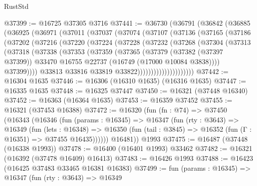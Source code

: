 \begin{lexlean}{RustStd}
\begin{coremodule}
@37399 := @16725 @37305 @3716
@37441 := @36730
    (@36791
      (@36842
        (@36885
          (@36925
            (@36971
              (@37011
                (@37037
                  (@37074
                    (@37107
                      (@37136
                        (@37165
                          (@37186
                            (@37202
                              (@37216
                                (@37220
                                  (@37224
                                    (@37228
                                      (@37232
                                        (@37268
                                          (@37304
                                            (@37313
                                              (@37318
                                                (@37338
                                                  (@37353
                                                    (@37359
                                                      (@37365
                                                        (@37379
                                                          (@37382 (@37397 @37399))
                                                          @33470
                                                          @16755
                                                          @22737
                                                          (@16749 (@17000 @10084 @3838))))
                                                      @37399))))
                                              @33813
                                              @33816
                                              @33819
                                              @33822)))))))))))))))))))))
@37442 := @16304 @1635
@37446 := @16306 (@16310 @1635) (@16316 @1635)
@37447 := @16335 @1635
@37448 := @16325 @37447
@37450 := @16321 (@37448 @16340)
@37452 := @16363 (@16364 @1635)
@37453 := @16359 @37452
@37455 := @16321 (@37453 @16388)
@37472 := @16320
    (fun (fn : @74) =>
    @37450
      (@16343
        (@16346
          (fun (params : @16345) =>
          @16347
            (fun (rty : @3643) =>
            @16349
              (fun (lets : @16348) =>
              @16350 (fun (tail : @3845) => @16352 (fun (Γ : @16351) => @37455 @16435))))))
        @16481))
    @1993
@37475 := @16487 (@37448 (@16338 @1993))
@37478 := @16400 (@16401 @1993) @33462
@37482 := @16321 (@16392 (@37478 @16409) @16413)
@37483 := @16426 @1993
@37488 := @16423 (@16425 @37483 @33465 @16381 @16383)
@37499 := fun (params : @16345) =>
  @16347
    (fun (rty : @3643) =>
    @16349

\end{coremodule}
\end{lexlean}
